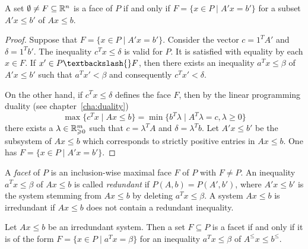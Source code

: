 \begin{lemma}
  \label{po:lem:4}
  A set $\emptyset \neq F \subseteq \mathbb{R}^n$ is a face of $P$
  if and only if $F = \{ x \in P \mid A'x = b'\}$ for a subset $A'x\leq b'$ of $Ax\leq b$.
\end{lemma}

\begin{proof}
  Suppose that $F = \{ x \in P \mid A'x = b'\}$. Consider the vector $c =
  1^TA'$ and $\delta = 1^Tb'$. The inequality $c^Tx\leq \delta$ is valid for
  $P$. It is satisfied with equality by each $x \in F$. If $x' \in P\textbackslash{}
  F$, then there exists an inequality $a^Tx\leq\beta$ of $A'x\leq b'$ such
  that $ a^Tx' < \beta$ and consequently $c^Tx'<\delta$. 

  On the other hand, if $c^Tx\leq\delta$ defines the face $F$,
  then by the linear programming duality (see chapter~\ref{cha:duality})
  \[ \max\{ c^Tx \mid Ax\leq b \} = \min\{ b^T\lambda \mid A^T\lambda = c, \lambda \geq 0 \} \]
  there exists a $\lambda \in \mathbb{R}^m_{\geqslant 0}$ such that $c=\lambda^TA$ and $\delta = \lambda^Tb$.
  Let $A'x\leq b'$ be the
  subsystem of $Ax\leq b$ which corresponds to strictly positive entries
  in $Ax\leq b$. One has $F = \{ x \in P \mid A'x = b'\}$. 
\end{proof}





A \emph{facet} of $P$ is an inclusion-wise maximal face $F$ of $P$
with $F\neq P$.  An inequality $a^Tx\leq\beta$ of $Ax\leq b$ is called
\emph{redundant} if $P(A,b) = P(A',b')$, where $A'x\leq b'$ is the system
stemming from $Ax\leq b$ by deleting $a^Tx\leq\beta$.  A system $Ax\leq b$ is
irredundant if $Ax\leq b$ does not contain a redundant inequality.

\begin{lemma}
  \label{po:lem:1}
  Let $Ax\leq b$ be an irredundant system. 
  Then a set $F\subseteq P$ is a facet if and only if it is
  of the form $F = \{ x \in P \mid a^Tx = \beta\}$ for an
  inequality $a^Tx\leq\beta$ of $A^\leq x\leq b^\leq$. 
\end{lemma}


